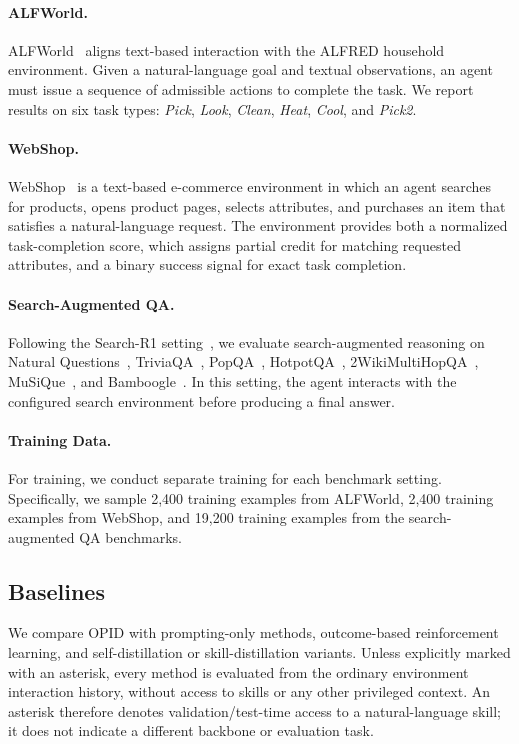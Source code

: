\documentclass{llmxive}
\begin{document}
\paragraph{ALFWorld.}
ALFWorld~\citep{shridhar2020alfworld} aligns text-based interaction with the ALFRED household environment. Given a natural-language goal and textual observations, an agent must issue a sequence of admissible actions to complete the task. We report results on six task types: \textit{Pick}, \textit{Look}, \textit{Clean}, \textit{Heat}, \textit{Cool}, and \textit{Pick2}.

\paragraph{WebShop.}
WebShop~\citep{yao2022webshop} is a text-based e-commerce environment in which an agent searches for products, opens product pages, selects attributes, and purchases an item that satisfies a natural-language request. The environment provides both a normalized task-completion score, which assigns partial credit for matching requested attributes, and a binary success signal for exact task completion.

\paragraph{Search-Augmented QA.}
Following the Search-R1 setting~\citep{jin2025searchr1}, we evaluate search-augmented reasoning on Natural Questions~\citep{kwiatkowski2019natural}, TriviaQA~\citep{joshi2017triviaqa}, PopQA~\citep{mallen2023popqa}, HotpotQA~\citep{yang2018hotpotqa}, 2WikiMultiHopQA~\citep{ho2020constructing}, MuSiQue~\citep{trivedi2022musique}, and Bamboogle~\citep{press2023measuring}. In this setting, the agent interacts with the configured search environment before producing a final answer.

\paragraph{Training Data.}
For training, we conduct separate training for each benchmark setting. Specifically, we sample 2,400 training examples from ALFWorld, 2,400 training examples from WebShop, and 19,200 training examples from the search-augmented QA benchmarks.

\subsection{Baselines}\label{app:baselines}
We compare OPID with prompting-only methods, outcome-based reinforcement learning, and self-distillation or skill-distillation variants. Unless explicitly marked with an asterisk, every method is evaluated from the ordinary environment interaction history, without access to skills or any other privileged context. An asterisk therefore denotes validation/test-time access to a natural-language skill; it does not indicate a different backbone or evaluation task.
\end{document}
